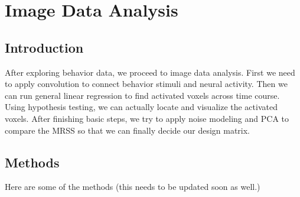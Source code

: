 \section{Image Data Analysis}
\subsection{Introduction}
\noindent
After exploring behavior data, we proceed to image data analysis.  First we need to apply
 convolution to connect behavior stimuli and neural activity. Then we can run general linear
  regression to find activated voxels across time course. Using hypothesis testing, we can 
  actually locate and visualize the activated voxels. After finishing basic steps, we try to 
  apply noise modeling and PCA to compare the MRSS so that we can finally decide our design matrix.

\subsection{Methods}
Here are some of the methods (this needs to be updated soon as well.)

